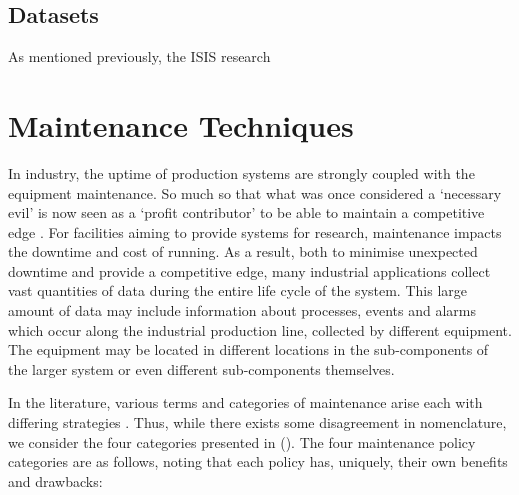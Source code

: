 \documentclass[10pt,oneside]{report}
\begin{document}
\subsection{Datasets}

As mentioned previously, the ISIS research 



\section{Maintenance Techniques}\label{sec:maintenanceTechniques}
In industry, the uptime of production systems are strongly coupled with the equipment maintenance. So much so that what was once considered a `necessary evil' is now seen as a `profit contributor' to be able to maintain a competitive edge \cite{waeyenbergh2002framework, faccio2014industrial}. For facilities aiming to provide systems for research, maintenance impacts the downtime and cost of running. As a result, both to minimise unexpected downtime and provide a competitive edge, many industrial applications collect vast quantities of data during the entire life cycle of the system. This large amount of data may include information about processes, events and alarms \cite{carvalho2019systematic} which occur along the industrial production line, collected by different equipment. The equipment may be located in different locations in the sub-components of the larger system or even different sub-components themselves. 

In the literature, various terms and categories of maintenance arise each with differing strategies \cite{susto2012predictive, mobley2002introduction, susto2016dealing}. Thus, while there exists some disagreement in nomenclature, we consider the four categories presented in (\citet{susto2012predictive}). The four maintenance policy categories are as follows, noting that each policy has, uniquely, their own benefits and drawbacks:
\end{document}
